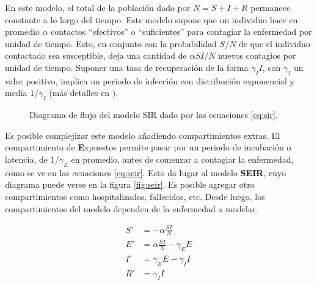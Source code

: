 En este modelo, el total de la población dado por \(N = S + I + R\) permanece constante a lo largo del tiempo. Este modelo supone que un individuo hace en promedio \(\alpha\) contactos  ``efectivos'' o ``suficientes'' para contagiar la enfermedad por unidad de tiempo. Esto, en conjunto con la probabilidad \(S/N\) de que el individuo contactado sea susceptible, deja una cantidad de \(\alpha S I / N\) nuevos contagios por unidad de tiempo. Suponer una tasa de recuperación de la forma \(\gamma_I I\), con \(\gamma_I\) un valor positivo, implica un periodo de infección con distribución exponencial y media \(1/\gamma_I\) (más detalles en \cite{Brauer2019}).




\begin{figure}[!h]
\centering
{}

\caption{Diagrama de flujo del modelo SIR dado por las ecuaciones \ref{eq:sir}.} \label{fig:sir}
\end{figure}



Es posible complejizar este modelo añadiendo compartimientos extras. El compartimiento de \textbf{E}xpuestos permite pasar por un periodo de incubación o latencia, de \(1/\gamma_E\) en promedio, antes de comenzar a contagiar la enfermedad, como se ve en las ecuaciones \ref{eq:seir}. Esto da lugar al modelo \textbf{SEIR}, cuyo diagrama puede verse en la figura \ref{fig:seir}. Es posible agregar otro compartimientos como hospitalizados, fallecidos, etc. Desde luego, los compartimientos del modelo dependen de la enfermedad a modelar.


\begin{equation}
\label{eq:seir}
\begin{aligned}
S' &=  -\alpha \frac{SI}{N} \\
E' &= \alpha \frac{SI}{N} - \gamma_E E \\
I' &= \gamma_E E - \gamma_I I \\
R' &= \gamma_I I
\end{aligned}
\end{equation}


